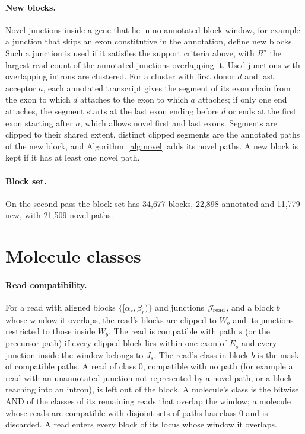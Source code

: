 \documentclass[11pt]{article}
\begin{document}
\paragraph{New blocks.} Novel junctions inside a gene that lie in no annotated block window, for example a junction that skips an exon constitutive in the annotation, define new blocks. Such a junction is used if it satisfies the support criteria above, with $R^\star$ the largest read count of the annotated junctions overlapping it. Used junctions with overlapping introns are clustered. For a cluster with first donor $d$ and last acceptor $a$, each annotated transcript gives the segment of its exon chain from the exon to which $d$ attaches to the exon to which $a$ attaches; if only one end attaches, the segment starts at the last exon ending before $d$ or ends at the first exon starting after $a$, which allows novel first and last exons. Segments are clipped to their shared extent, distinct clipped segments are the annotated paths of the new block, and Algorithm~\ref{alg:novel} adds its novel paths. A new block is kept if it has at least one novel path.

\paragraph{Block set.} On the second pass the block set has 34{,}677 blocks, 22{,}898 annotated and 11{,}779 new, with 21{,}509 novel paths.

\section{Molecule classes}
\label{sec:classes}

\paragraph{Read compatibility.} For a read with aligned blocks $\{[\alpha_r,\beta_r)\}$ and junctions $\mathcal J_{\rm read}$, and a block $b$ whose window it overlaps, the read's blocks are clipped to $W_b$ and its junctions restricted to those inside $W_b$. The read is compatible with path $s$ (or the precursor path) if every clipped block lies within one exon of $E_s$ and every junction inside the window belongs to $J_s$. The read's class in block $b$ is the mask of compatible paths. A read of class 0, compatible with no path (for example a read with an unannotated junction not represented by a novel path, or a block reaching into an intron), is left out of the block. A molecule's class is the bitwise AND of the classes of its remaining reads that overlap the window; a molecule whose reads are compatible with disjoint sets of paths has class 0 and is discarded. A read enters every block of its locus whose window it overlaps.
\end{document}
